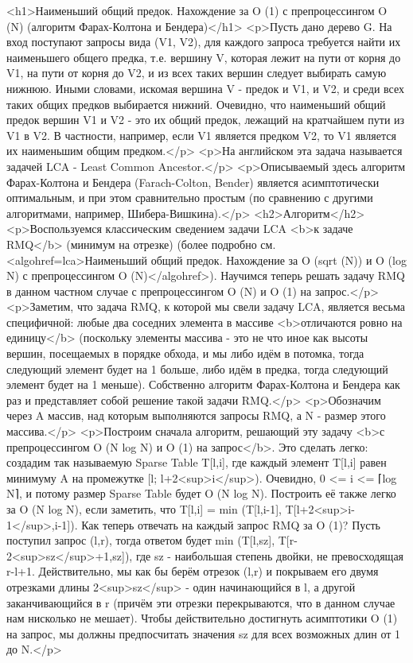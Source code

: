 <h1>Наименьший общий предок. Нахождение за O (1) с препроцессингом O (N) (алгоритм Фарах-Колтона и Бендера)</h1>
<p>Пусть дано дерево G. На вход поступают запросы вида (V1, V2), для каждого запроса требуется найти их наименьшего общего предка, т.е. вершину V, которая лежит на пути от корня до V1, на пути от корня до V2, и из всех таких вершин следует выбирать самую нижнюю. Иными словами, искомая вершина V - предок и V1, и V2, и среди всех таких общих предков выбирается нижний. Очевидно, что наименьший общий предок вершин V1 и V2 - это их общий предок, лежащий на кратчайшем пути из V1 в V2. В частности, например, если V1 является предком V2, то V1 является их наименьшим общим предком.</p>
<p>На английском эта задача называется задачей LCA - Least Common Ancestor.</p>
<p>Описываемый здесь алгоритм Фарах-Колтона и Бендера (Farach-Colton, Bender) является асимптотически оптимальным, и при этом сравнительно простым (по сравнению с другими алгоритмами, например, Шибера-Вишкина).</p>
<h2>Алгоритм</h2>
<p>Воспользуемся классическим сведением задачи LCA <b>к задаче RMQ</b> (минимум на отрезке) (более подробно см. <algohref=lca>Наименьший общий предок. Нахождение за O (sqrt (N)) и O (log N) с препроцессингом O (N)</algohref>). Научимся теперь решать задачу RMQ в данном частном случае с препроцессингом O (N) и O (1) на запрос.</p>
<p>Заметим, что задача RMQ, к которой мы свели задачу LCA, является весьма специфичной: любые два соседних элемента в массиве <b>отличаются ровно на единицу</b> (поскольку элементы массива - это не что иное как высоты вершин, посещаемых в порядке обхода, и мы либо идём в потомка, тогда следующий элемент будет на 1 больше, либо идём в предка, тогда следующий элемент будет на 1 меньше). Собственно алгоритм Фарах-Колтона и Бендера как раз и представляет собой решение такой задачи RMQ.</p>
<p>Обозначим через A массив, над которым выполняются запросы RMQ, а N - размер этого массива.</p>
<p>Построим сначала алгоритм, решающий эту задачу <b>с препроцессингом O (N log N) и O (1) на запрос</b>. Это сделать легко: создадим так называемую Sparse Table T[l,i], где каждый элемент T[l,i] равен минимуму A на промежутке [l; l+2<sup>i</sup>). Очевидно, 0 <= i <= ⌈log N⌉, и потому размер Sparse Table будет O (N log N). Построить её также легко за O (N log N), если заметить, что T[l,i] = min (T[l,i-1], T[l+2<sup>i-1</sup>,i-1]). Как теперь отвечать на каждый запрос RMQ за O (1)? Пусть поступил запрос (l,r), тогда ответом будет min (T[l,sz], T[r-2<sup>sz</sup>+1,sz]), где sz - наибольшая степень двойки, не превосходящая r-l+1. Действительно, мы как бы берём отрезок (l,r) и покрываем его двумя отрезками длины 2<sup>sz</sup> - один начинающийся в l, а другой заканчивающийся в r (причём эти отрезки перекрываются, что в данном случае нам нисколько не мешает). Чтобы действительно достигнуть асимптотики O (1) на запрос, мы должны предпосчитать значения sz для всех возможных длин от 1 до N.</p>
